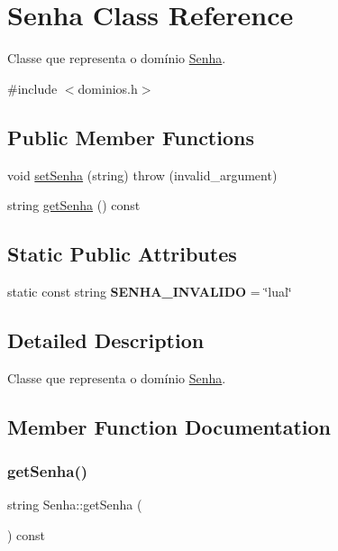 \hypertarget{classSenha}{}\section{Senha Class Reference}
\label{classSenha}


Classe que representa o domínio \hyperlink{classSenha}{Senha}.  




{\ttfamily \#include $<$dominios.\+h$>$}

\subsection*{Public Member Functions}
\begin{DoxyCompactItemize}
\item 
void \hyperlink{classSenha_a735e4bf5f65cc8d28daa7dbf202fd999}{set\+Senha} (string)  throw (invalid\+\_\+argument)
\item 
string \hyperlink{classSenha_a1cc904431d0a8287d0b22dee3e9d34ae}{get\+Senha} () const
\end{DoxyCompactItemize}
\subsection*{Static Public Attributes}
\begin{DoxyCompactItemize}
\item 
\mbox{\label{classSenha_a600acb936480f4db8c997fe40441defc}} 
static const string {\bfseries S\+E\+N\+H\+A\+\_\+\+I\+N\+V\+A\+L\+I\+DO} = \char`\"{}lual\char`\"{}
\end{DoxyCompactItemize}


\subsection{Detailed Description}
Classe que representa o domínio \hyperlink{classSenha}{Senha}. 

\subsection{Member Function Documentation}
\mbox{\label{classSenha_a1cc904431d0a8287d0b22dee3e9d34ae}} 
\subsubsection{\texorpdfstring{get\+Senha()}{getSenha()}}
{\footnotesize\ttfamily string Senha\+::get\+Senha (\begin{DoxyParamCaption}{ }\end{DoxyParamCaption}) const\hspace{0.3cm}{\ttfamily [inline]}}

